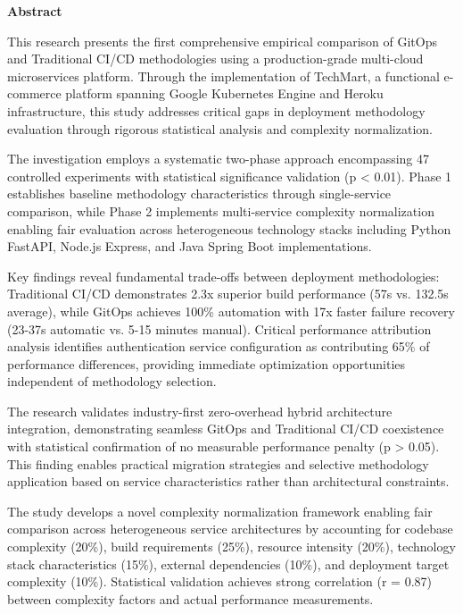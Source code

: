 \thispagestyle{empty}

\begin{center}
{\Large \textbf{Abstract}}
\end{center}

\vspace{1cm}

This research presents the first comprehensive empirical comparison of GitOps and Traditional CI/CD methodologies using a production-grade multi-cloud microservices platform. Through the implementation of TechMart, a functional e-commerce platform spanning Google Kubernetes Engine and Heroku infrastructure, this study addresses critical gaps in deployment methodology evaluation through rigorous statistical analysis and complexity normalization.

The investigation employs a systematic two-phase approach encompassing 47 controlled experiments with statistical significance validation (p < 0.01). Phase 1 establishes baseline methodology characteristics through single-service comparison, while Phase 2 implements multi-service complexity normalization enabling fair evaluation across heterogeneous technology stacks including Python FastAPI, Node.js Express, and Java Spring Boot implementations.

Key findings reveal fundamental trade-offs between deployment methodologies: Traditional CI/CD demonstrates 2.3x superior build performance (57s vs. 132.5s average), while GitOps achieves 100\% automation with 17x faster failure recovery (23-37s automatic vs. 5-15 minutes manual). Critical performance attribution analysis identifies authentication service configuration as contributing 65\% of performance differences, providing immediate optimization opportunities independent of methodology selection.

The research validates industry-first zero-overhead hybrid architecture integration, demonstrating seamless GitOps and Traditional CI/CD coexistence with statistical confirmation of no measurable performance penalty (p > 0.05). This finding enables practical migration strategies and selective methodology application based on service characteristics rather than architectural constraints.

The study develops a novel complexity normalization framework enabling fair comparison across heterogeneous service architectures by accounting for codebase complexity (20\%), build requirements (25\%), resource intensity (20\%), technology stack characteristics (15\%), external dependencies (10\%), and deployment target complexity (10\%). Statistical validation achieves strong correlation (r = 0.87) between complexity factors and actual performance measurements.


